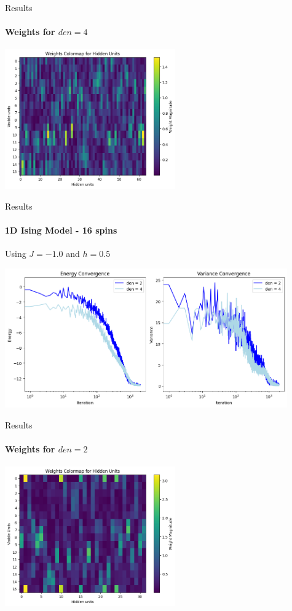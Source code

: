 \documentclass{beamer}
\begin{document}
\begin{frame}{Results}
\framesubtitle{Weights for $den = 4$}
\begin{center}
\includegraphics[height=6cm]{images/16spin_den4_j1.png}
\end{center}
\end{frame}

\begin{frame}{Results}
\framesubtitle{1D Ising Model - 16 spins}
Using $J = -1.0$ and $h=0.5$
\begin{center}
\includegraphics[height=6cm]{images/16spin_history_jm1.png}
\end{center}
\end{frame}

\begin{frame}{Results}
\framesubtitle{Weights for $den = 2$}
\begin{center}
\includegraphics[height=6cm]{images/16spin_den2_jm1.png}
\end{center}
\end{frame}
\end{document}
